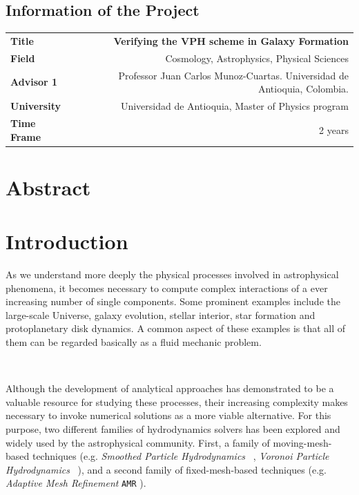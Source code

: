 \documentclass[a4,useAMS,usenatbib,usegraphicx,12pt]{article}
\begin{document}
\subsection*{Information of the Project}
\begin{tabular}{L!{\VRule}R}
\bf Title		& \bf Verifying the VPH scheme in Galaxy Formation\\
\bf Field		& Cosmology, Astrophysics, Physical Sciences \\
\bf Advisor 1	& Professor Juan Carlos Munoz-Cuartas. Universidad de Antioquia, Colombia.\\
\bf University	& Universidad de Antioquia, Master of Physics program \\
\bf Time Frame	& 2 years \\
\end{tabular}
\normalsize

\section{Abstract}
\newpage


\section{Introduction}
As we understand more deeply the physical processes involved in astrophysical 
phenomena, it becomes necessary to compute complex interactions of a ever 
increasing number of single components. Some prominent examples include 
the large-scale Universe, galaxy evolution, stellar interior, star formation 
and protoplanetary disk dynamics. A common aspect of these examples is that all 
of them can be regarded basically as a fluid mechanic problem.

\

Although the development of analytical approaches has demonstrated to be a
valuable resource for studying these processes, their increasing complexity 
makes necessary to invoke numerical solutions as a more viable alternative. For
this purpose, two different families of hydrodynamics solvers has been explored
and widely used by the astrophysical community. First, a family of 
moving-mesh-based techniques (e.g. \textit{Smoothed Particle Hydrodynamics} 
\SPH\ \citep{Monaghan92}, \textit{Voronoi Particle Hydrodynamics} \VPH\ 
\citep{Hess10}), and a second family of fixed-mesh-based techniques (e.g.
\textit{Adaptive Mesh Refinement} \texttt{AMR} \citep{Berger89}).
\end{document}
